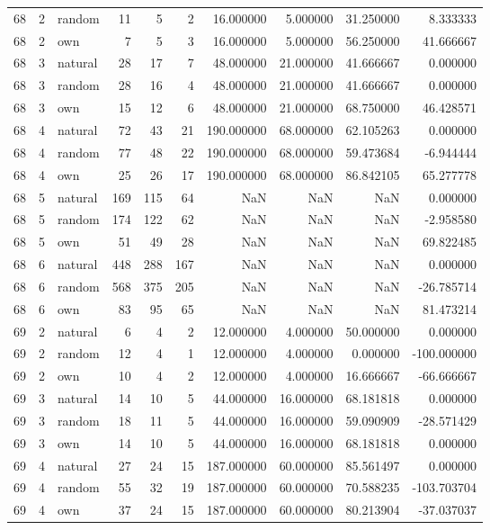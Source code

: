 \begin{table}[htbp]
\begin{tabular}{rrlrrrrrrr}
68 & 2 & random & 11 & 5 & 2 & 16.000000 & 5.000000 & 31.250000 & 8.333333 \\
68 & 2 & own & 7 & 5 & 3 & 16.000000 & 5.000000 & 56.250000 & 41.666667 \\
68 & 3 & natural & 28 & 17 & 7 & 48.000000 & 21.000000 & 41.666667 & 0.000000 \\
68 & 3 & random & 28 & 16 & 4 & 48.000000 & 21.000000 & 41.666667 & 0.000000 \\
68 & 3 & own & 15 & 12 & 6 & 48.000000 & 21.000000 & 68.750000 & 46.428571 \\
68 & 4 & natural & 72 & 43 & 21 & 190.000000 & 68.000000 & 62.105263 & 0.000000 \\
68 & 4 & random & 77 & 48 & 22 & 190.000000 & 68.000000 & 59.473684 & -6.944444 \\
68 & 4 & own & 25 & 26 & 17 & 190.000000 & 68.000000 & 86.842105 & 65.277778 \\
68 & 5 & natural & 169 & 115 & 64 & NaN & NaN & NaN & 0.000000 \\
68 & 5 & random & 174 & 122 & 62 & NaN & NaN & NaN & -2.958580 \\
68 & 5 & own & 51 & 49 & 28 & NaN & NaN & NaN & 69.822485 \\
68 & 6 & natural & 448 & 288 & 167 & NaN & NaN & NaN & 0.000000 \\
68 & 6 & random & 568 & 375 & 205 & NaN & NaN & NaN & -26.785714 \\
68 & 6 & own & 83 & 95 & 65 & NaN & NaN & NaN & 81.473214 \\
69 & 2 & natural & 6 & 4 & 2 & 12.000000 & 4.000000 & 50.000000 & 0.000000 \\
69 & 2 & random & 12 & 4 & 1 & 12.000000 & 4.000000 & 0.000000 & -100.000000 \\
69 & 2 & own & 10 & 4 & 2 & 12.000000 & 4.000000 & 16.666667 & -66.666667 \\
69 & 3 & natural & 14 & 10 & 5 & 44.000000 & 16.000000 & 68.181818 & 0.000000 \\
69 & 3 & random & 18 & 11 & 5 & 44.000000 & 16.000000 & 59.090909 & -28.571429 \\
69 & 3 & own & 14 & 10 & 5 & 44.000000 & 16.000000 & 68.181818 & 0.000000 \\
69 & 4 & natural & 27 & 24 & 15 & 187.000000 & 60.000000 & 85.561497 & 0.000000 \\
69 & 4 & random & 55 & 32 & 19 & 187.000000 & 60.000000 & 70.588235 & -103.703704 \\
69 & 4 & own & 37 & 24 & 15 & 187.000000 & 60.000000 & 80.213904 & -37.037037 \\

\end{tabular}
\end{table}
